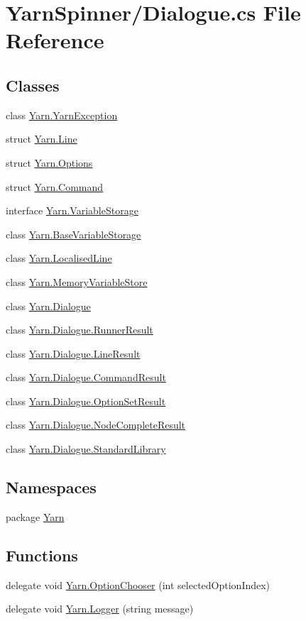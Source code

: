 \hypertarget{a00265}{\section{Yarn\-Spinner/\-Dialogue.cs File Reference}
\label{a00265}
}
\subsection*{Classes}
\begin{DoxyCompactItemize}
\item 
class \hyperlink{a00170}{Yarn.\-Yarn\-Exception}
\item 
struct \hyperlink{a00031_d2/d41/a00318}{Yarn.\-Line}
\item 
struct \hyperlink{a00031_db/d53/a00321}{Yarn.\-Options}
\item 
struct \hyperlink{a00031_d4/d6f/a00315}{Yarn.\-Command}
\item 
interface \hyperlink{a00166}{Yarn.\-Variable\-Storage}
\item 
class \hyperlink{a00023}{Yarn.\-Base\-Variable\-Storage}
\item 
class \hyperlink{a00108}{Yarn.\-Localised\-Line}
\item 
class \hyperlink{a00110}{Yarn.\-Memory\-Variable\-Store}
\item 
class \hyperlink{a00072}{Yarn.\-Dialogue}
\item 
class \hyperlink{a00132}{Yarn.\-Dialogue.\-Runner\-Result}
\item 
class \hyperlink{a00106}{Yarn.\-Dialogue.\-Line\-Result}
\item 
class \hyperlink{a00032}{Yarn.\-Dialogue.\-Command\-Result}
\item 
class \hyperlink{a00119}{Yarn.\-Dialogue.\-Option\-Set\-Result}
\item 
class \hyperlink{a00113}{Yarn.\-Dialogue.\-Node\-Complete\-Result}
\item 
class \hyperlink{a00140}{Yarn.\-Dialogue.\-Standard\-Library}
\end{DoxyCompactItemize}
\subsection*{Namespaces}
\begin{DoxyCompactItemize}
\item 
package \hyperlink{a00031}{Yarn}
\end{DoxyCompactItemize}
\subsection*{Functions}
\begin{DoxyCompactItemize}
\item 
delegate void \hyperlink{a00031_a39866cbb03c03a35805d598b5d4ad553}{Yarn.\-Option\-Chooser} (int selected\-Option\-Index)
\item 
delegate void \hyperlink{a00031_a1e50031b945a3a2afafee6f590730568}{Yarn.\-Logger} (string message)
\end{DoxyCompactItemize}


